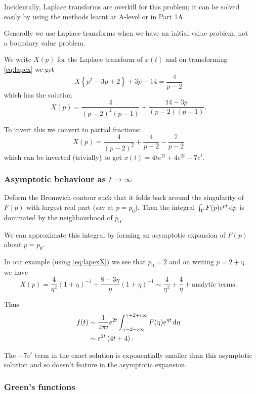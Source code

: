 \documentclass{notes}
\theoremstyle{plain}
\begin{document}
Incidentally, Laplace transforms are overkill for this problem; it can
be solved easily by using the methods learnt at A-level or in Part 1A.

Generally we use Laplace transforms when we have an initial value problem,
not a boundary value problem.

We write $X(p)$ for the Laplace transform of $x(t)$ and on transforming
\eqref{eq:lapex} we get
\[
X \left\{ p^2 - 3 p + 2\right\} + 3p - 14 = \frac{4}{p-2}
\]
which has the solution
\begin{equation}\label{eq:lapexX}
X(p) = \frac{4}{(p-2)^2 (p-1)} + \frac{14-3p}{(p-2)(p-1)}.
\end{equation}

To invert this we convert to partial fractions:
\[
X(p) = \frac{4}{(p-2)^2} + \frac{4}{p-2} - \frac{7}{p-2}
\]
which can be inverted (trivially) to get $x(t) = 4 t e^{2 t} + 4 e^{2 t}
- 7 e^t$.

\subsubsection*{Asymptotic behaviour as $t \to \infty$}

Deform the Bromwich contour such that it folds back around the singularity
of $F(p)$ with largest real part (say at $p = p_0$).  Then the
integral $\int_\Gamma F(p) e^{p t}\, \mathrm{d} p$ is dominated by the neighbourhood
of $p_0$.

We can approximate this integral by forming an asymptotic expansion of
$F(p)$ about $p=p_0$.

In our example (using \eqref{eq:lapexX}) we see that $p_0 = 2$ and
on writing $p = 2+ \eta$ we have
\[
X(p) = \frac{4}{\eta^2} \left(1+\eta\right)^{-1}
+ \frac{8 - 3 \eta}{\eta} \left( 1+ \eta\right)^{-1}
\sim \frac{4}{\eta^2} + \frac{4}{\eta} + \text{analytic terms}.
\]

Thus
\begin{align*}
f(t) &\sim \frac{1}{2 \pi \imath} e^{2 t} \int_{\gamma - 2 - \imath \infty}
^{\gamma+2+\imath \infty} F(\eta) e^{\eta t}\, \mathrm{d} \eta \\
&\sim e^{2 t} \left( 4 t + 4 \right).
\end{align*}

The $-7 e^t$ term in the exact solution is exponentially smaller than this
asymptotic solution and so doesn't feature in the asymptotic expansion.

\subsubsection*{Green's functions}
\end{document}
